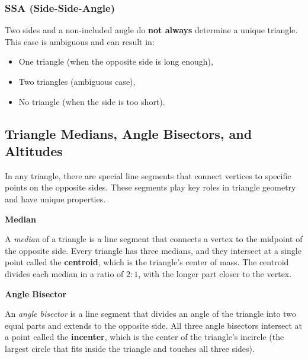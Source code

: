\subsubsection{SSA (Side-Side-Angle)}
Two sides and a non-included angle do \textbf{not always} determine a unique triangle. This case is ambiguous and can result in:
\begin{itemize}
    \item One triangle (when the opposite side is long enough),
    \item Two triangles (ambiguous case),
    \item No triangle (when the side is too short).
\end{itemize}
\begin{center}
\end{center}

\subsection{Triangle Medians, Angle Bisectors, and Altitudes}

In any triangle, there are special line segments that connect vertices to specific points on the opposite sides. These segments play key roles in triangle geometry and have unique properties.

\textbf{Median}

A \emph{median} of a triangle is a line segment that connects a vertex to the midpoint of the opposite side. Every triangle has three medians, and they intersect at a single point called the \textbf{centroid}, which is the triangle’s center of mass. The centroid divides each median in a ratio of \( 2:1 \), with the longer part closer to the vertex.

\textbf{Angle Bisector}

An \emph{angle bisector} is a line segment that divides an angle of the triangle into two equal parts and extends to the opposite side. All three angle bisectors intersect at a point called the \textbf{incenter}, which is the center of the triangle's incircle (the largest circle that fits inside the triangle and touches all three sides).

